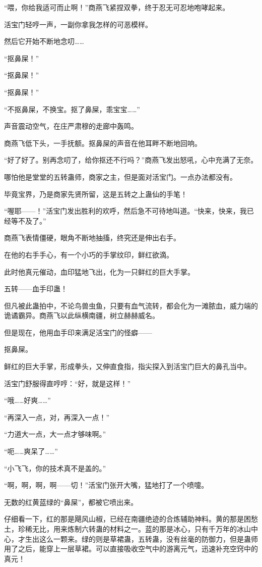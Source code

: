 \begin{this_body}
“喂，你给我适可而止啊！”商燕飞紧捏双拳，终于忍无可忍地咆哮起来。

活宝门轻哼一声，一副你拿我怎样的可恶模样。

然后它开始不断地念叨……

“抠鼻屎！”

“抠鼻屎！”

“抠鼻屎！”

“不抠鼻屎，不换宝。抠了鼻屎，乖宝宝……”

声音震动空气，在庄严肃穆的走廊中轰鸣。

商燕飞低下头，一手抚额。抠鼻屎的声音在他耳畔不断地回响。

“好了好了。别再念叨了，给你抠还不行吗？”商燕飞发出怒吼，心中充满了无奈。

哪怕他是堂堂的五转蛊师，商家之主，但是面对活宝门。一点办法都没有。

毕竟宝界，乃是商家先贤所留，这是五转之上蛊仙的手笔！

“喔耶——！”活宝门发出胜利的欢呼，然后急不可待地叫道。“快来，快来，我已经等不及了。”

商燕飞表情僵硬，眼角不断地抽搐，终究还是伸出右手。

在他的右手手心，有一个小巧的手掌纹印，鲜红欲滴。

此时他真元催动，血印猛地飞出，化为一只鲜红的巨大手掌。

五转——血手印蛊！

但凡被此蛊拍中，不论鸟兽虫鱼，只要有血气流转，都会化为一滩脓血，威力端的诡谲霸异。商燕飞以此纵横南疆，树立赫赫威名。

但是现在，他用血手印来满足活宝门的怪癖——

抠鼻屎。

鲜红的巨大手掌，形成拳头，又伸直食指，指尖探入到活宝门巨大的鼻孔当中。

活宝门舒服得直哼哼：“好，就是这样！”

“哦……好爽……”

“再深入一点，对，再深入一点！”

“力道大一点，大一点才够味啊。”

“呃……爽呆了……”

“小飞飞，你的技术真不是盖的。”

“啊，啊，啊，啊——切！”活宝门张开大嘴，猛地打了一个喷嚏。

无数的红黄蓝绿的“鼻屎”，都被它喷出来。

仔细看一下，红的那是飓风山椒，已经在南疆绝迹的合炼辅助神料。黄的那是困愁土，珍稀无比，用来炼制六转蛊的材料之一。蓝的那是冰心，只有千万年的冰山中心，才生出这么一颗来。绿的则是草裙蛊，五转蛊，没有丝毫的防御力，但是蛊师用了之后，能穿上一层草裙。可以直接吸收空气中的游离元气，迅速补充空窍中的真元！


\end{this_body}

